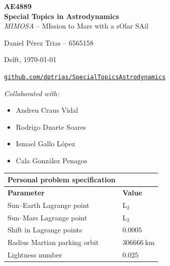 \documentclass[a4paper,12pt]{article}
\begin{document}
\thispagestyle{empty}
\vspace*{2cm}
\begin{center}
    {\LARGE \textbf{AE4889 \\ Special Topics in Astrodynamics} \\ \textit{MIMOSA} -- MIssion to Mars with a sOlar SAil \par}
    \vspace{1cm}
    {\Large Daniel Pérez Trias -- 6565158 \par}
    {\Large Delft, \today\par}
    \vspace{1em}
    {\large \href{https://github.com/dptrias/SpecialTopicsAstrodynamics}{\texttt{github.com/dptrias/SpecialTopicsAstrodynamics}} \par}
    \vspace{1em}
    {\normalsize \textit{Collaborated with:} \par}
    \vspace{0.5em}
    {\normalsize
        \begin{minipage}{0.4\textwidth}
            \begin{itemize}[label=\textendash,leftmargin=*]
                \item Andreu Craus Vidal
                \item Rodrigo Duarte Soares
                \item Ismael Gallo López
                \item Cala González Penagos
            \end{itemize}
        \end{minipage}
    \par}
    \vspace{4em}
    \begin{tabular}{ll}
        Personal problem specification & \\
        \toprule
        \textbf{Parameter} & \textbf{Value} \\
        \midrule
        Sun--Earth Lagrange point     & L$_2$ \\
        Sun--Mars Lagrange point    & L$_2$ \\
        Shift in Lagrange points     & $0.0005$ \\
        Radius Martian parking orbit & $\SI{306 666}{\km}$ \\
        Lightness number             & $0.025$ \\
        \bottomrule
    \end{tabular}
\end{center}
\end{document}
